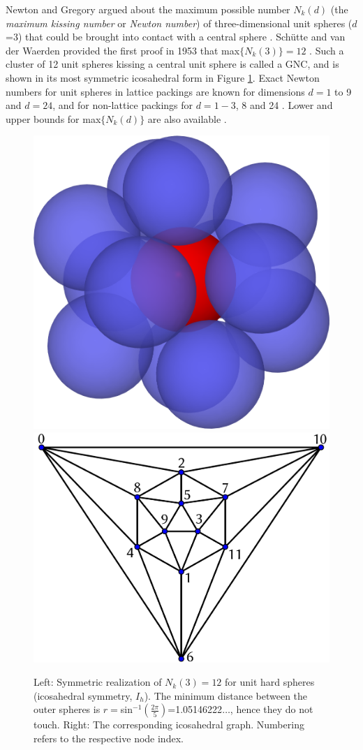 Newton and Gregory argued about the maximum possible number $N_k(d)$ (the
\textit{maximum kissing number} or \textit{Newton number}) of three-dimensional
unit spheres ($d$=3) that could be brought into contact with a central sphere
\autocite{Pfender_KissingNumbersSphere_2004}. Sch\"utte and van der Waerden
provided the first proof in 1953 that max$\{N_k(3)\}=12$
\autocite{Schutte_ProblemdreizehnKugeln_1952}. Such a cluster of 12 unit
spheres kissing a central unit sphere is called a \ac{GNC}, and is shown in its
most symmetric icosahedral form in Figure \ref{fig:GN}. Exact Newton numbers
for unit spheres in lattice packings are known for dimensions $d=1$ to 9 and
$d=24$, and for non-lattice packings for $d=1-3$, 8 and 24
\autocite{conway-2013book,Musin_proof24cellconjecture_2018}.  Lower and upper
bounds for max$\{N_k(d)\}$ are also available
\autocite{Mittelmann_Highaccuracysemidefiniteprogramming_2010,conway-2013book}. 
\begin{figure}[htb]
    \centering
    \includegraphics[width=.4\textwidth]{gregory-newton/Kissing-3d.png} \quad
    \includegraphics[width=.45\textwidth]{gregory-newton/ico.pdf}
    \caption{Left: Symmetric realization of $N_k(3)=12$ for unit hard spheres
    (icosahedral symmetry, $I_h$).  The minimum distance between the outer
    spheres is $r=$sin$^{-1}\left(\frac{2\pi}{5}\right)$=1.05146222$\dots$,
    hence they do not touch. Right: The corresponding icosahedral graph.
    Numbering refers to the respective node index.}
    \label{fig:GN}
\end{figure}

